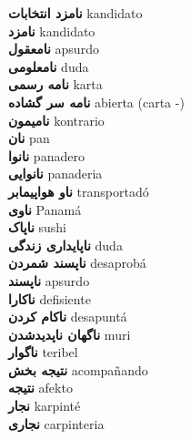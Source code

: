 \textbf{ نامزد انتخابات  } kandidato \\
\textbf{ نامزد  } kandidato \\
\textbf{ نامعقول  } apsurdo \\
\textbf{ نامعلومی  } duda \\
\textbf{ نامه رسمی  } karta \\
\textbf{ نامه سر گشاده  } abierta (carta -) \\
\textbf{ نامیمون  } kontrario \\
\textbf{ نان  } pan \\
\textbf{ نانوا  } panadero \\
\textbf{ نانوایی  } panaderia \\
\textbf{ ناو هواپیمابر  } transportadó \\
\textbf{ ناوی  } Panamá \\
\textbf{ ناپاک  } sushi \\
\textbf{ ناپایداری زندگی  } duda \\
\textbf{ ناپسند شمردن  } desaprobá \\
\textbf{ ناپسند  } apsurdo \\
\textbf{ ناکارا  } defisiente \\
\textbf{ ناکام کردن  } desapuntá \\
\textbf{ ناگهان ناپدیدشدن  } muri \\
\textbf{ ناگوار  } teribel \\
\textbf{ نتیجه بخش  } acompañando \\
\textbf{ نتیجه  } afekto \\
\textbf{ نجار  } karpinté \\
\textbf{ نجاری  } carpinteria \\
